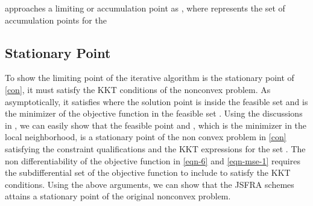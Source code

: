 approaches a limiting or accumulation point  as , where  represents the set of accumulation points for the

\subsection{Stationary Point}

To show the limiting point of the iterative algorithm is the stationary point of \eqref{con}, it must satisfy the \ac{KKT} conditions of the nonconvex problem. As  asymptotically, it satisfies
where the solution point is inside the feasible set  and  is the minimizer of the objective function  in the feasible set . Using the discussions in \cite{marks1978technical}, we can easily show that the feasible point  and , which is the minimizer in the local neighborhood, is a stationary point of the non convex problem in \eqref{con} satisfying the constraint qualifications and the \ac{KKT} expressions for the set . The non differentiability of the objective function in \eqref{eqn-6} and \eqref{eqn-mse-1} requires the subdifferential set of the objective function to include  to satisfy the \ac{KKT} conditions. Using the above arguments, we can show that the \ac{JSFRA} schemes attains a stationary point of the original nonconvex problem. 
